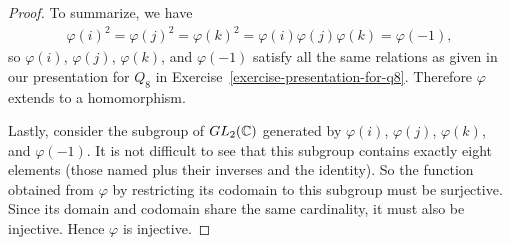 \begin{proof}
  To summarize, we have
  \begin{align*}
    \varphi(i)^2 = \varphi(j)^2 = \varphi(k)^2
    = \varphi(i)\varphi(j)\varphi(k) = \varphi(-1),
  \end{align*}
  so $\varphi(i)$, $\varphi(j)$, $\varphi(k)$, and $\varphi(-1)$
  satisfy all the same relations as given in our presentation for
  $Q_8$ in Exercise~\ref{exercise-presentation-for-q8}. Therefore
  $\varphi$ extends to a homomorphism.

  Lastly, consider the subgroup of $GL_2(\mathbb{C})$ generated by
  $\varphi(i)$, $\varphi(j)$, $\varphi(k)$, and $\varphi(-1)$. It is
  not difficult to see that this subgroup contains exactly eight
  elements (those named plus their inverses and the identity). So the
  function obtained from $\varphi$ by restricting its codomain to this
  subgroup must be surjective. Since its domain and codomain share the
  same cardinality, it must also be injective. Hence $\varphi$ is
  injective.
\end{proof}
